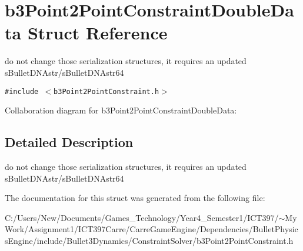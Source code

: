 \hypertarget{structb3_point2_point_constraint_double_data}{
\section{b3Point2PointConstraintDoubleData Struct Reference}
\label{structb3_point2_point_constraint_double_data}
}
do not change those serialization structures, it requires an updated sBulletDNAstr/sBulletDNAstr64  


{\tt \#include $<$b3Point2PointConstraint.h$>$}

Collaboration diagram for b3Point2PointConstraintDoubleData:

\subsection{Detailed Description}
do not change those serialization structures, it requires an updated sBulletDNAstr/sBulletDNAstr64 

The documentation for this struct was generated from the following file:\begin{CompactItemize}
\item 
C:/Users/New/Documents/Games\_\-Technology/Year4\_\-Semester1/ICT397/$\sim$My Work/Assignment1/ICT397Carre/CarreGameEngine/Dependencies/BulletPhysicsEngine/include/Bullet3Dynamics/ConstraintSolver/b3Point2PointConstraint.h\end{CompactItemize}
